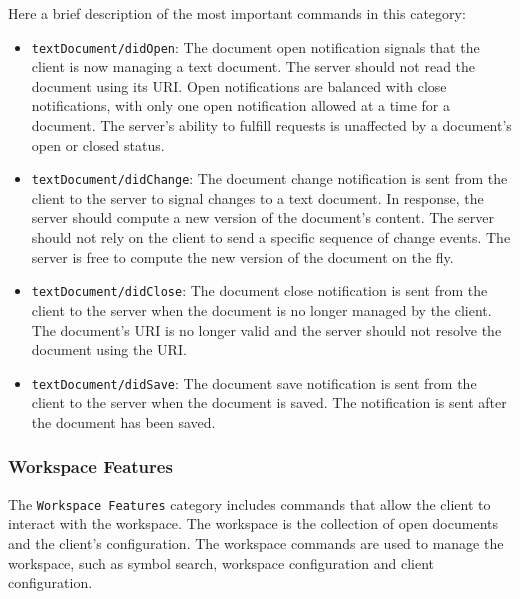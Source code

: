 Here a brief description of the most important commands in this category:
\begin{itemize}
    \item \texttt{textDocument/didOpen}: The document open notification signals that the client is now managing a text document. The server should not read the document using its URI. Open notifications are balanced with close notifications, with only one open notification allowed at a time for a document. The server's ability to fulfill requests is unaffected by a document's open or closed status.
    \item \texttt{textDocument/didChange}: The document change notification is sent from the client to the server to signal changes to a text document. In response, the server should compute a new version of the document's content. The server should not rely on the client to send a specific sequence of change events. The server is free to compute the new version of the document on the fly.
    \item \texttt{textDocument/didClose}: The document close notification is sent from the client to the server when the document is no longer managed by the client. The document's URI is no longer valid and the server should not resolve the document using the URI.
    \item \texttt{textDocument/didSave}: The document save notification is sent from the client to the server when the document is saved. The notification is sent after the document has been saved.
\end{itemize}

\subsubsection{Workspace Features}\label{subsec:WorkspaceFeatures}
The \texttt{Workspace Features} category includes commands that allow the client to interact with the workspace. The workspace is the collection of open documents and the client's configuration. The workspace commands are used to manage the workspace, such as symbol search, workspace configuration and client configuration.


